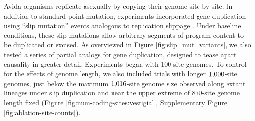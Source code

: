 Avida organisms replicate asexually by copying their genome site-by-site.
In addition to standard point mutation, experiments
incorporated gene duplication using ``slip mutation'' events analogous to replication slippage \citep{bzymek_instability_2001}.
Under baseline conditions, these slip mutations allow arbitrary segments of program content to be duplicated or excised.
As overviewed in Figure \ref{fig:slip_mut_variants}, we also tested a series of partial analogs for gene duplication, designed to tease apart causality in greater detail.
Experiments began with 100-site genomes.
To control for the effects of genome length, we also included trials with longer $1{\small,}000$-site genomes, just below the maximum $1{\small,}016$-site genome size observed along extant lineages under slip duplication and near the upper extreme of 870-site genome length fixed (Figure \ref{fig:num-coding-sites:vestigial}, Supplementary Figure \ref{fig:ablation-site-counts}).



